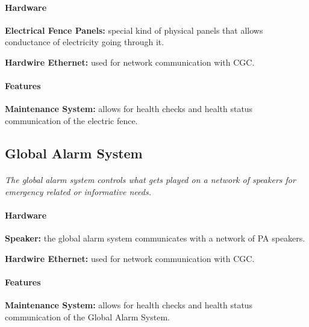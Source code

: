 \documentclass[12pt]{article}
\begin{document}
	\paragraph{Hardware}
	\begin{list}{}{}
		\item \textbf{Electrical Fence Panels: }special kind of physical panels that allows conductance of electricity going through it.
		\item \textbf{Hardwire Ethernet: }used for network communication with CGC. 
	\end{list}
	
	\paragraph{Features}
	\begin{list}{}{}
		\item \textbf{Maintenance System: }allows for health checks and health status communication of the electric fence.
	\end{list}

	\subsection{Global Alarm System}
	\paragraph{} \textit{The global alarm system controls what gets played on a network of speakers for emergency related or informative needs.}		

	\paragraph{Hardware}
	\begin{list}{}{}
		\item \textbf{Speaker: }the global alarm system communicates with a network of PA speakers.
		\item \textbf{Hardwire Ethernet: }used for network communication with CGC. 
	\end{list}
	
	\paragraph{Features}
	\begin{list}{}{}
		\item \textbf{Maintenance System: }allows for health checks and health status communication of the Global Alarm System.  
	\end{list}
\end{document}
